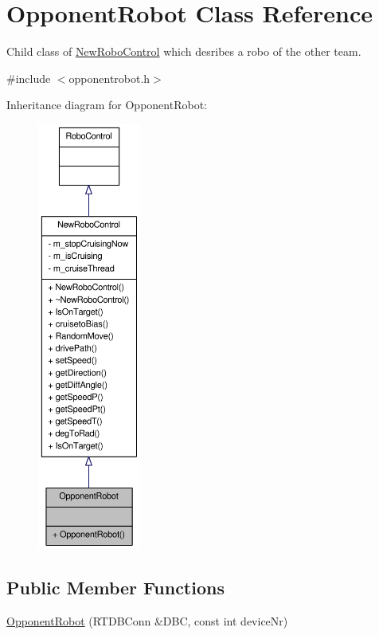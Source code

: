 \hypertarget{classOpponentRobot}{
\section{OpponentRobot Class Reference}
\label{classOpponentRobot}
}


Child class of \hyperlink{classNewRoboControl}{NewRoboControl} which desribes a robo of the other team.  




{\ttfamily \#include $<$opponentrobot.h$>$}



Inheritance diagram for OpponentRobot:\nopagebreak
\begin{figure}[H]
\begin{center}
\leavevmode
\includegraphics[height=400pt]{classOpponentRobot__inherit__graph}
\end{center}
\end{figure}
\subsection*{Public Member Functions}
\begin{DoxyCompactItemize}
\item 
\hyperlink{classOpponentRobot_a315c08a9f17d278b1bb8067929b38f83}{OpponentRobot} (RTDBConn \&DBC, const int deviceNr)
\end{DoxyCompactItemize}


